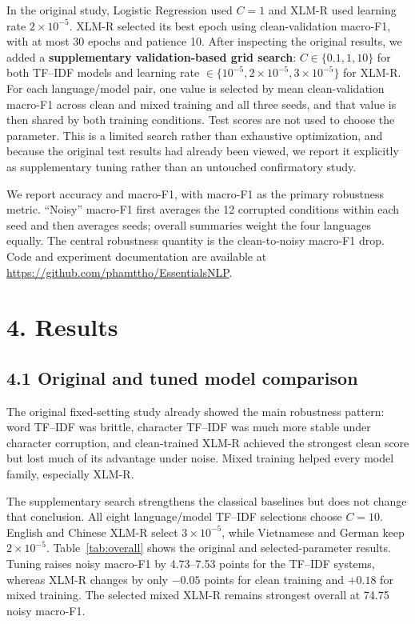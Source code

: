 \documentclass[11pt,a4paper]{article}
\begin{document}
In the original study, Logistic Regression used $C=1$ and XLM-R used learning rate $2\times10^{-5}$. XLM-R selected its best epoch using clean-validation macro-F1, with at most 30 epochs and patience 10. After inspecting the original results, we added a \textbf{supplementary validation-based grid search}: $C\in\{0.1,1,10\}$ for both TF--IDF models and learning rate $\in\{10^{-5},2\times10^{-5},3\times10^{-5}\}$ for XLM-R. For each language/model pair, one value is selected by mean clean-validation macro-F1 across clean and mixed training and all three seeds, and that value is then shared by both training conditions. Test scores are not used to choose the parameter. This is a limited search rather than exhaustive optimization, and because the original test results had already been viewed, we report it explicitly as supplementary tuning rather than an untouched confirmatory study.

We report accuracy and macro-F1, with macro-F1 as the primary robustness metric. ``Noisy'' macro-F1 first averages the 12 corrupted conditions within each seed and then averages seeds; overall summaries weight the four languages equally. The central robustness quantity is the clean-to-noisy macro-F1 drop. Code and experiment documentation are available at \url{https://github.com/phamttho/EssentialsNLP}.

\section*{4. Results}
\subsection*{4.1 Original and tuned model comparison}
The original fixed-setting study already showed the main robustness pattern: word TF--IDF was brittle, character TF--IDF was much more stable under character corruption, and clean-trained XLM-R achieved the strongest clean score but lost much of its advantage under noise. Mixed training helped every model family, especially XLM-R.

The supplementary search strengthens the classical baselines but does not change that conclusion. All eight language/model TF--IDF selections choose $C=10$. English and Chinese XLM-R select $3\times10^{-5}$, while Vietnamese and German keep $2\times10^{-5}$. Table~\ref{tab:overall} shows the original and selected-parameter results. Tuning raises noisy macro-F1 by 4.73--7.53 points for the TF--IDF systems, whereas XLM-R changes by only $-0.05$ points for clean training and $+0.18$ for mixed training. The selected mixed XLM-R remains strongest overall at 74.75 noisy macro-F1.
\end{document}
